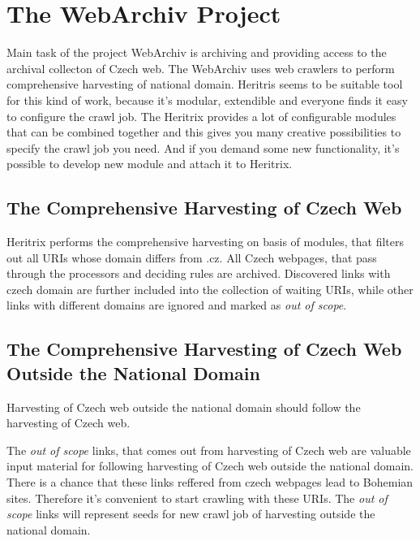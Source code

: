 \documentclass[11pt,a4paper]{article}
\begin{document}

\section{The WebArchiv Project}

Main task of the project WebArchiv is archiving and providing access to the archival collecton of Czech web. The WebArchiv uses web crawlers to perform comprehensive harvesting of national domain. Heritris seems to be suitable tool for this kind of work, because it's modular, extendible and everyone finds it easy to configure the crawl job. The Heritrix provides a lot of configurable modules that can be combined together and this gives you many creative possibilities to specify the crawl job you need. And if you demand some new functionality, it's possible to develop new module and attach it to Heritrix.

\subsection*{The Comprehensive Harvesting of Czech Web}
Heritrix performs the comprehensive harvesting on basis of modules, that filters out all URIs whose domain differs from .cz. All Czech webpages, that pass through the processors and deciding rules are archived. Discovered links with czech domain are further included into the collection of waiting URIs, while other links with different domains are ignored and marked as \emph{out of scope}.

\subsection*{The Comprehensive Harvesting of Czech Web Outside the National Domain}
Harvesting of Czech web outside the national domain should follow the harvesting of Czech web. 

The \emph{out of scope} links, that comes out from harvesting of Czech web are valuable input material for following harvesting of Czech web outside the national domain. There is a chance that these links reffered from czech webpages lead to Bohemian sites. Therefore it's convenient to start crawling with these URIs. The \emph{out of scope} links will represent seeds for new crawl job of harvesting outside the national domain.

\end{document}
